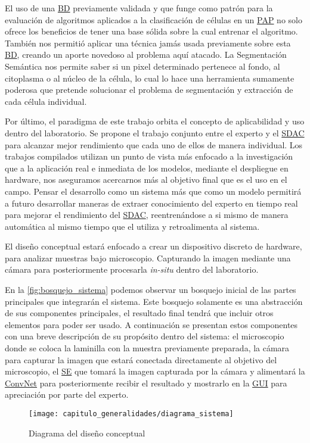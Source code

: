El uso de una \hyperlink{abbr}{BD} previamente validada y que funge como patrón
para la evaluación de algoritmos aplicados a la clasificación de células en un
\hyperlink{abbr}{PAP} no solo ofrece los beneficios de tener una base sólida
sobre la cual entrenar el algoritmo. También nos permitió aplicar una técnica
jamás usada previamente sobre esta \hyperlink{abbr}{BD}, creando un aporte
novedoso al problema aquí atacado. La Segmentación Semántica nos permite saber
si un pixel determinado pertenece al fondo, al citoplasma o al núcleo de la
célula, lo cual lo hace una herramienta sumamente poderosa que pretende
solucionar el problema de segmentación y extracción de cada célula individual.

Por último, el paradigma de este trabajo orbita el concepto de aplicabilidad y
uso dentro del laboratorio. Se propone el trabajo conjunto entre el experto y el
\hyperlink{abbr}{SDAC} para alcanzar mejor rendimiento que cada uno de ellos de
manera individual. Los trabajos compilados utilizan un punto de vista más
enfocado a la investigación que a la aplicación real e inmediata de los modelos,
mediante el despliegue en hardware, nos aseguramos acercarnos más al objetivo
final que es el uso en el campo. Pensar el desarrollo como un sistema más que
como un modelo permitirá a futuro desarrollar maneras de extraer conocimiento
del experto en tiempo real para mejorar el rendimiento del
\hyperlink{abbr}{SDAC}, reentrenándose a si mismo de manera automática al mismo
tiempo que el utiliza y retroalimenta al sistema. 

El diseño conceptual estará enfocado a crear un dispositivo discreto de
hardware, para analizar muestras bajo microscopio. Capturando la imagen mediante
una cámara para posteriormente procesarla \emph{in-situ} dentro del laboratorio.

En la \autoref{fig:bosquejo_sistema} podemos observar un bosquejo inicial de las
partes principales que integrarán el sistema. Este bosquejo solamente es una
abstracción de sus componentes principales, el resultado final tendrá que
incluir otros elementos para poder ser usado. A continuación se presentan estos
componentes con una breve descripción de su propósito dentro del sistema: el
microscopio donde se coloca la laminilla con la muestra previamente preparada,
la cámara para capturar la imagen que estará conectada directamente al objetivo
del microscopio, el \hyperlink{abbr}{SE} que tomará la imagen capturada por la
cámara y alimentará la \hyperlink{abbr}{ConvNet} para posteriormente recibir el
resultado y mostrarlo en la \hyperlink{abbr}{GUI} para apreciación por parte del
experto.

\begin{figure}[H]
    \centering
    \texttt{[image: capitulo\_generalidades/diagrama\_sistema]}
    \caption{Diagrama del diseño conceptual}\label{fig:bosquejo_sistema}
\end{figure}